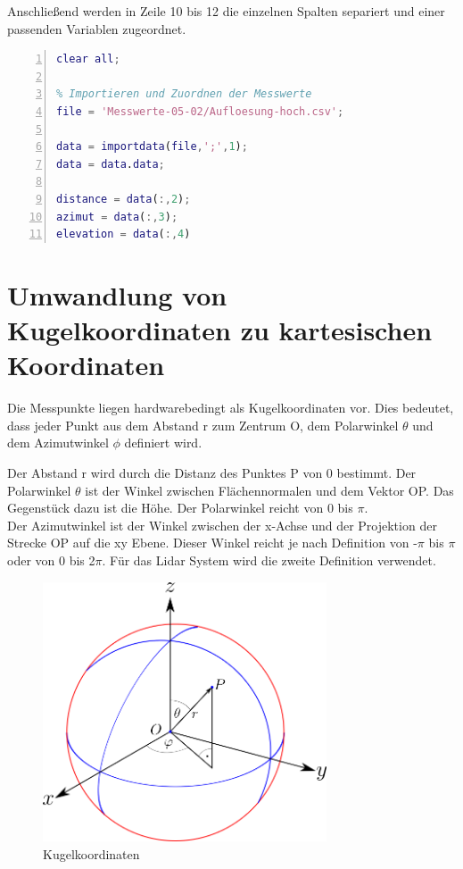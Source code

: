 Anschließend werden in Zeile 10 bis 12 die einzelnen Spalten separiert und einer passenden Variablen zugeordnet. 

\begin{lstlisting}[caption={Importieren und Zuordnen von .csv Dateien},language={Matlab}, label={import_data}, numbers=left]
% Anwendung zur Darstellung einer 3D Punktewolke aus einem LIDAR System
clear all;

% Importieren und Zuordnen der Messwerte
file = 'Messwerte-05-02/Aufloesung-hoch.csv';

data = importdata(file,';',1); 
data = data.data;

distance = data(:,2);
azimut = data(:,3);
elevation = data(:,4)
\end{lstlisting}


\section{Umwandlung von Kugelkoordinaten zu kartesischen Koordinaten}

Die Messpunkte liegen hardwarebedingt als Kugelkoordinaten vor. Dies bedeutet, dass jeder Punkt aus dem Abstand r zum Zentrum O, dem Polarwinkel $\theta$ und dem Azimutwinkel $\phi$ definiert wird.

Der Abstand r wird durch die Distanz des Punktes P von 0 bestimmt. Der Polarwinkel $\theta$ ist der Winkel zwischen Flächennormalen und dem Vektor OP. Das Gegenstück dazu ist die Höhe.  Der Polarwinkel reicht von 0 bis $\pi$. \\
Der Azimutwinkel ist der Winkel zwischen der x-Achse und der Projektion der Strecke OP auf die xy Ebene. Dieser Winkel reicht je nach Definition von  -$\pi$ bis $\pi$ oder von 0 bis 2$\pi$. Für das Lidar System wird die zweite Definition verwendet.

\begin{figure}[H]
	\centering
	\includegraphics[width=0.75\textwidth]{images/Auswertung/Kugelkoordinaten}
	\caption{Kugelkoordinaten}
	\label{kugelkoordinaten}
\end{figure}



